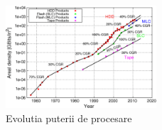 \begin{figure}
  \centering
  \includegraphics[width=0.5\textwidth]{memory_trends}
  \caption{Evolutia puterii de procesare\cite{memory_trends} }
  \label{fig:memory_trends}
\end{figure}

